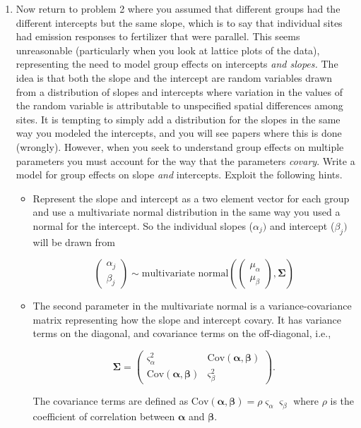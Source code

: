 \documentclass[12pt, oneside]{article}
\begin{document}
\begin{enumerate} [leftmargin=*]
\item Now return to problem 2 where you assumed that different groups had the different intercepts but the same slope, which is to say that individual sites had emission responses to fertilizer that were parallel. This seems unreasonable (particularly when you look at lattice plots of the data), representing the need to model group effects on intercepts \emph{and slopes.} The idea is that both the slope and the intercept are random variables drawn from a distribution of slopes and intercepts where variation in the values of the random variable is attributable to unspecified spatial differences among sites. It is tempting to simply add a distribution for the slopes
in the same way you modeled the intercepts, and you will see papers where this is done (wrongly). However, when you seek to understand group effects on multiple parameters you must account for the way that the parameters \emph{covary}. Write a model for group effects on slope \emph{and} intercepts. Exploit the following hints.

\begin{itemize}
\item Represent the slope and intercept as a two element vector for each group and use a multivariate normal distribution in the same way you used a normal for the intercept. So the individual slopes ($\alpha_{j})$ and intercept ($\beta_{j})$ will be drawn from 

\begin{equation*}
\left(\begin{array}{c}
\alpha_{j}\\
\beta_{j}
\end{array}\right)\sim\text{multivariate normal}\left(\left(\begin{array}{c}
\mu_{\alpha}\\
\mu_{\beta}
\end{array}\right),\bm{\Sigma}\right)
\end{equation*}
\vspace{5mm}

\item The second parameter in the multivariate normal is a variance-covariance matrix representing how the slope and intercept covary. It has variance terms on the diagonal, and covariance terms on the off-diagonal, i.e., 

\begin{equation*}
\bm{\Sigma}=\left(\begin{array}{cc}
\varsigma_{\alpha}^{2} & \text{Cov}(\bm{\alpha},\bm{\beta})\\
\text{Cov}(\bm{\alpha},\bm{\beta}) & \varsigma_{\beta}^{2}
\end{array}\right).
\end{equation*}
\vspace{5mm}

The covariance terms are defined as $\text{Cov}(\bm{\alpha},\bm{\beta})=\rho\varsigma_{\alpha}\varsigma_{\beta}$ where $\rho$ is the coefficient of correlation between $\bm{\alpha}$ and $\bm{\beta}$.
\end{itemize}
\end{enumerate}
\end{document}
